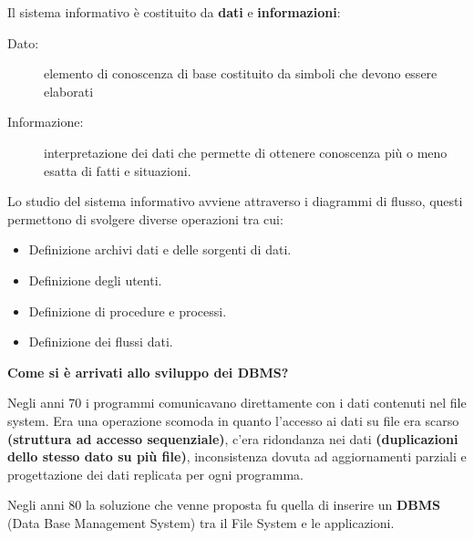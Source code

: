\documentclass[a4paper, 12pt]{book}
\begin{document}
    \vspace{15pt}



    Il sistema informativo è costituito da \textbf{dati} e \textbf{informazioni}:
    \begin{description}
      \item [Dato:] elemento di conoscenza di base costituito da simboli che devono essere elaborati
      \item [Informazione:] interpretazione dei dati che permette di ottenere conoscenza più o meno esatta di fatti e situazioni.
    \end{description}
    
    Lo studio del sistema informativo avviene attraverso i diagrammi di flusso, questi permettono di svolgere diverse operazioni tra cui: 
    \begin{itemize}
      \item Definizione archivi dati e delle sorgenti di dati.
      \item Definizione degli utenti.
      \item Definizione di procedure e processi.
      \item Definizione dei flussi dati.
    \end{itemize}


    \clearpage
    \textbf{\large Come si è arrivati allo sviluppo dei DBMS?}
 
    Negli anni 70 i programmi comunicavano direttamente con i dati contenuti nel file system. Era una operazione scomoda in quanto l’accesso ai dati su file era scarso \textbf{(struttura ad accesso sequenziale)}, c'era ridondanza nei dati \textbf{(duplicazioni dello stesso dato su più file)}, inconsistenza dovuta ad aggiornamenti parziali e progettazione dei dati replicata per ogni programma.

    Negli anni 80 la soluzione che venne proposta fu quella di inserire un \textbf{DBMS} (Data Base Management System) tra il File System e le applicazioni.
\end{document}
